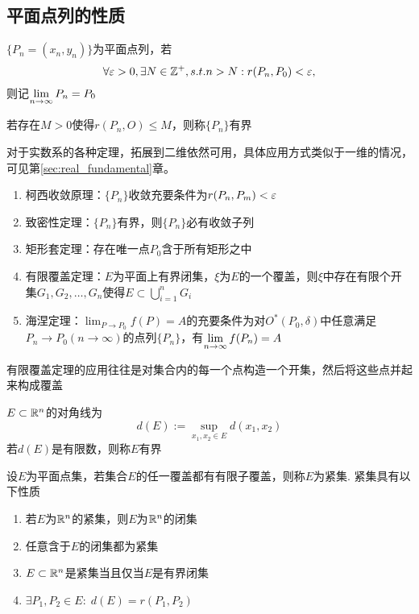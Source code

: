 \subsection{平面点列的性质}
\begin{definition}[平面点列的极限]
$\{P_n=(x_n,y_n)\}$为平面点列，若
\[\forall \varepsilon>0,\exists N\in\mathbb{Z}^+,s.t. n>N:r(P_n,P_0)<\varepsilon,\]
则记$\displaystyle\lim_{n\to\infty}P_n=P_0$
\end{definition}
\begin{definition}[有界]
若存在$M>0$使得$r(P_n,O)\leq M$，则称$\{P_n\}$有界
\end{definition}
对于实数系的各种定理，拓展到二维依然可用，具体应用方式类似于一维的情况，可见第\ref{sec:real_fundamental}章。
\begin{theorem}
\begin{enumerate}
	\item 柯西收敛原理：$\{P_n\}$收敛充要条件为$r(P_n,P_m)<\varepsilon$
	\item 致密性定理：$\{P_n\}$有界，则$\{P_n\}$必有收敛子列
	\item 矩形套定理：存在唯一点$P_0$含于所有矩形之中
	\item 有限覆盖定理：$E$为平面上有界闭集，$\xi$为$E$的一个覆盖，则$\xi$中存在有限个开集$G_1,G_2,\ldots,G_n$使得$E\subset \bigcup_{i=1}^n G_i$
	\item 海涅定理：$\lim_{P\to P_0}f(P)=A$的充要条件为对$O^*(P_0,\delta)$中任意满足$P_n\to P_0(n\to\infty)$的点列$\{P_n\}$，有$\displaystyle\lim_{n\to\infty}f(P_n)=A$
\end{enumerate}
有限覆盖定理的应用往往是对集合内的每一个点构造一个开集，然后将这些点并起来构成覆盖
\end{theorem}
\begin{definition}[对角线]
$E\subset \mathbb{R}^n$的对角线为
\[d(E):=\sup_{x_1,x_2\in E}d(x_1,x_2)\]
若$d(E)$是有限数，则称$E$有界
\end{definition}
\begin{definition}[紧集]
设$E$为平面点集，若集合$E$的任一覆盖都有有限子覆盖，则称$E$为紧集.
紧集具有以下性质
\begin{enumerate}
	\itemsep -3pt
	\item 若$E$为$\mathbb{R}^n$的紧集，则$E$为$\mathbb{R}^n$的闭集
	\item 任意含于$E$的闭集都为紧集
	\item $E\subset\mathbb{R}^n$是紧集当且仅当$E$是有界闭集
	\item $\exists P_1,P_2\in E:\;d(E)=r(P_1,P_2)$
\end{enumerate}
\end{definition}
